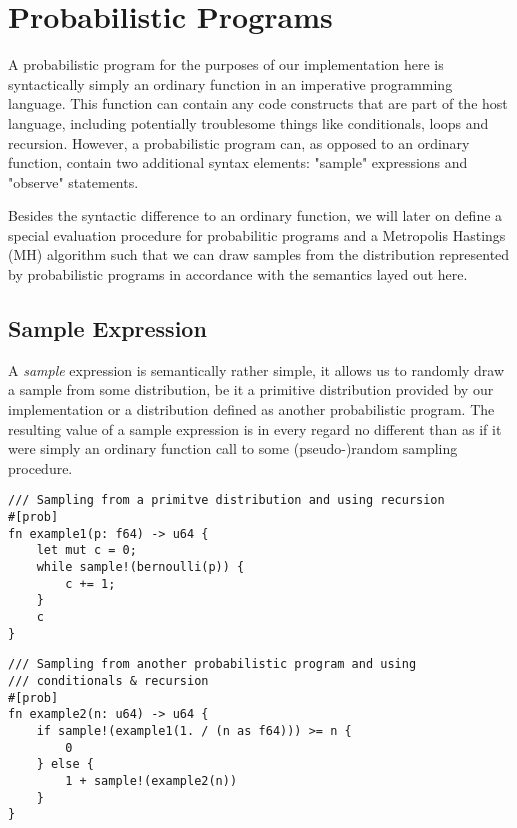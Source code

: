 \section{Probabilistic Programs}

A probabilistic program for the purposes of our implementation here is syntactically simply an ordinary function in an imperative programming language. This function can contain any code constructs that are part of the host language, including potentially troublesome things like conditionals, loops and recursion. However, a probabilistic program can, as opposed to an ordinary function, contain two additional syntax elements: "sample" expressions and "observe" statements.

Besides the syntactic difference to an ordinary function, we will later on define a special evaluation procedure for probabilitic programs and a Metropolis Hastings (MH) algorithm such that we can draw samples from the distribution represented by probabilistic programs in accordance with the semantics layed out here.

\subsection{Sample Expression}

A \textit{sample} expression is semantically rather simple, it allows us to randomly draw a sample from some distribution, be it a primitive distribution provided by our implementation or a distribution defined as another probabilistic program. The resulting value of a sample expression is in every regard no different than as if it were simply an ordinary function call to some (pseudo-)random sampling procedure.

\begin{minipage}{\linewidth}
\begin{lstlisting}
/// Sampling from a primitve distribution and using recursion
#[prob]
fn example1(p: f64) -> u64 {
    let mut c = 0;
    while sample!(bernoulli(p)) {
        c += 1;
    }
    c
}
\end{lstlisting}
\end{minipage}

\begin{minipage}{\linewidth}
\begin{lstlisting}
/// Sampling from another probabilistic program and using
/// conditionals & recursion
#[prob]
fn example2(n: u64) -> u64 {
    if sample!(example1(1. / (n as f64))) >= n {
        0
    } else {
        1 + sample!(example2(n))
    }
}
\end{lstlisting}
\end{minipage}


